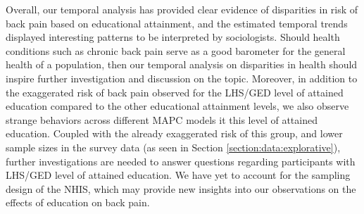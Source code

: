 \vspace{-0.2cm}
Overall, our temporal analysis has provided clear evidence of disparities in risk of back pain based on educational attainment, and the estimated temporal trends displayed interesting patterns to be interpreted by sociologists. Should health conditions such as chronic back pain serve as a good barometer for the general health of a population, then our temporal analysis on disparities in health should inspire further investigation and discussion on the topic. Moreover, in addition to the exaggerated risk of back pain observed for the LHS/GED level of attained education compared to the other educational attainment levels, we also observe strange behaviors across different MAPC models it this level of attained education. Coupled with the already exaggerated risk of this group, and lower sample sizes in the survey data (as seen in Section \ref{section:data:explorative}), further investigations are needed to answer questions regarding participants with LHS/GED level of attained education. We have yet to account for the sampling design of the NHIS, which may provide new insights into our observations on the effects of education on back pain.


